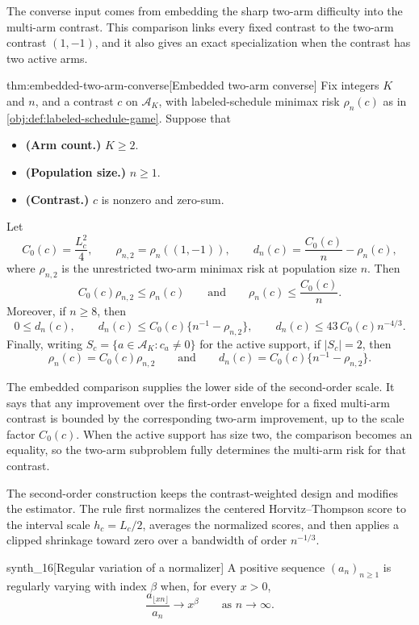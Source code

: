\documentclass[11pt]{article}
\begin{document}
The converse input comes from embedding the sharp two-arm difficulty into the multi-arm contrast. This comparison links every fixed contrast to the two-arm contrast \((1,-1)\), and it also gives an exact specialization when the contrast has two active arms.

\begin{theoremv}{thm:embedded-two-arm-converse}[Embedded two-arm converse]
Fix integers \(K\) and \(n\), and a contrast \(c\) on \(\mathcal A_K\), with labeled-schedule minimax risk \(\rho_n(c)\) as in \cref{obj:def:labeled-schedule-game}. Suppose that
\begin{itemize}
\item \textbf{(Arm count.)} \(K\geq 2\).
\item \textbf{(Population size.)} \(n\geq 1\).
\item \textbf{(Contrast.)} \(c\) is nonzero and zero-sum.
\end{itemize}
Let
\[
C_0(c)=\frac{L_c^2}{4},
\qquad
\rho_{n,2}=\rho_n((1,-1)),
\qquad
d_n(c)=\frac{C_0(c)}{n}-\rho_n(c),
\]
where \(\rho_{n,2}\) is the unrestricted two-arm minimax risk at population size \(n\). Then
\[
C_0(c)\rho_{n,2}\leq \rho_n(c)
\qquad\text{and}\qquad
\rho_n(c)\leq \frac{C_0(c)}{n}.
\]
Moreover, if \(n\geq 8\), then
\[
0\leq d_n(c),
\qquad
d_n(c)\leq C_0(c)\{n^{-1}-\rho_{n,2}\},
\qquad
d_n(c)\leq 43\,C_0(c)n^{-4/3}.
\]
Finally, writing \(S_c=\{a\in\mathcal A_K:c_a\neq 0\}\) for the active support, if \(|S_c|=2\), then
\[
\rho_n(c)=C_0(c)\rho_{n,2}
\qquad\text{and}\qquad
d_n(c)=C_0(c)\{n^{-1}-\rho_{n,2}\}.
\]
\end{theoremv}

The embedded comparison supplies the lower side of the second-order scale. It says that any improvement over the first-order envelope for a fixed multi-arm contrast is bounded by the corresponding two-arm improvement, up to the scale factor \(C_0(c)\). When the active support has size two, the comparison becomes an equality, so the two-arm subproblem fully determines the multi-arm risk for that contrast.

The second-order construction keeps the contrast-weighted design and modifies the estimator. The rule first normalizes the centered Horvitz--Thompson score to the interval scale \(h_c=L_c/2\), averages the normalized scores, and then applies a clipped shrinkage toward zero over a bandwidth of order \(n^{-1/3}\).

\begin{definitionv}{synth_16}[Regular variation of a normalizer]
A positive sequence \((a_n)_{n\ge1}\) is regularly varying with index \(\beta\) when, for every \(x>0\), \[ \frac{a_{\lfloor xn\rfloor}}{a_n}\longrightarrow x^\beta \qquad\text{as }n\to\infty . \]
\end{definitionv}
\end{document}
